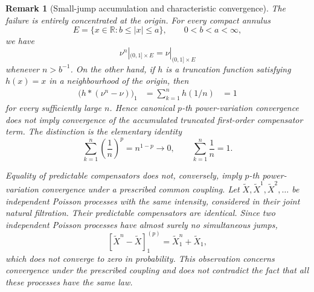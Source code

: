 \documentclass[a4paper,10pt]{article}
\newtheorem{rema}[thm]{Remark}
\begin{document}
\begin{rema}[Small-jump accumulation and characteristic convergence]
The failure is entirely concentrated at the origin. For every compact
annulus
\[
        E=\{x\in\mathbb R:b\le |x|\le a\},
        \qquad 0<b<a<\infty,
\]
we have
\[
        \nu^n|_{(0,1]\times E}
        =
        \nu|_{(0,1]\times E}
\]
whenever \(n>b^{-1}\). On the other hand, if \(h\) is a truncation
function satisfying \(h(x)=x\) in a neighbourhood of the origin, then
\[
\begin{aligned}
\bigl(h*(\nu^n-\nu)\bigr)_1
&=
\sum_{k=1}^n h(1/n)&=
1
\end{aligned}
\]
for every sufficiently large \(n\). Hence canonical \(p\)-th
power-variation convergence does not imply convergence of the
accumulated truncated first-order compensator term. The distinction is
the elementary identity
\[
        \sum_{k=1}^n\left(\frac1n\right)^p
        =
        n^{1-p}
        \longrightarrow0,
        \qquad
        \sum_{k=1}^n\frac1n=1.
\]

Equality of predictable compensators does not, conversely, imply
\(p\)-th power-variation convergence under a prescribed common
coupling. Let
\(\widetilde X,\widetilde X^1,\widetilde X^2,\ldots\)
be independent Poisson processes with the same intensity, considered
in their joint natural filtration. Their predictable compensators are
identical. Since two independent Poisson processes have almost surely
no simultaneous jumps,
\[
        [\widetilde X^n-\widetilde X]^{(p)}_1
        =
        \widetilde X_1^n+\widetilde X_1,
\]
which does not converge to zero in probability. This observation
concerns convergence under the prescribed coupling and does not
contradict the fact that all these processes have the same law.
\end{rema}
\end{document}
